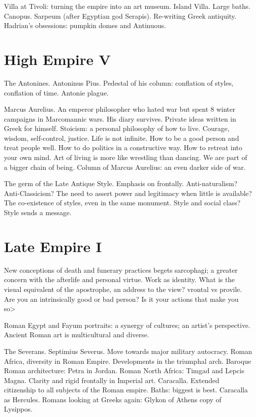\documentclass[10pt]{armath}
\begin{document}
\begin{multicols}{2}
Villa at Tivoli: turning the empire into an art museum. Island Villa. Large
baths. Canopus. Sarpeum (after Egyptian god Serapis). Re-writing Greek
antiquity. Hadrian's obsessions: pumpkin domes and Antinuous.

\section{High Empire V}%
\label{sec:high_empire_v}

The Antonines. Antoninus Pius. Pedestal of his column: conflation of styles,
conflation of time. Antonie plague.

Marcus Aurelius. An emperor philosopher who hated war but spent 8 winter
campaigns in Marcomannic wars. His diary survives. Private ideas written in
Greek for himself. Stoicism: a personal philosophy of how to live. Courage,
wisdom, self-control, justice. Life is not infinite. How to be a good person
and treat people well. How to do politics in a constructive way. How to retreat
into your own mind. Art of living is more like wrestling than dancing. We are
part of a bigger chain of being. Column of Marcus Aurelius: an even darker
side of war.

The germ of the Late Antique Style. Emphasis on frontally. Anti-naturalism?
Anti-Classicism? The need to assert power and legitimacy when little is
available? The co-existence of styles, even in the same monument. Style and
social class? Style sends a message.

\section{Late Empire I}%
\label{sec:late_empire_i}

New conceptions of death and funerary practices begets sarcophagi; a greater
concern with the afterlife and personal virtue. Work as identity. What is the
visual equivalent of the apostrophe, an address to the view? vrontal vs
provile. Are you an intrinsically good or bad person? Is it your actions that
make you so>

Roman Egypt and Fayum portraits: a synergy of cultures; an artist's perspective.
Ancient Roman art is multicultural and diverse.

The Severans. Septimius Severus. Move towards major military autocracy. Roman
Africa, diversity in Roman Empire. Developments in the triumphal arch. Baroque
Roman architecture: Petra in Jordan. Roman North Africa: Timgad and Lepcis
Magna. Clarity and rigid frontally in Imperial art. Caracalla. Extended
citizenship to all subjects of the Roman empire. Baths: biggest is best.
Caracalla as Hercules. Romans looking at Greeks again: Glykon of Athens copy of
Lysippos.


\end{multicols}
\end{document}
